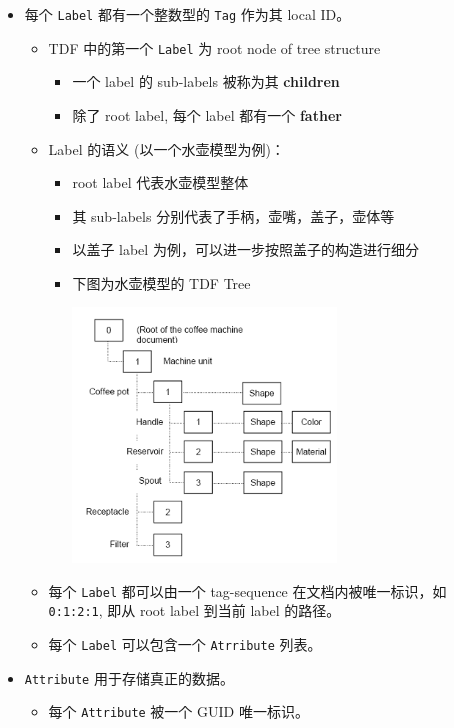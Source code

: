 \documentclass[11pt]{article}
\begin{document}
\begin{itemize}
\item 每个 \texttt{Label} 都有一个整数型的 \texttt{Tag} 作为其 local ID。
\begin{itemize}
\item TDF 中的第一个 \texttt{Label} 为 root node of tree structure
\begin{itemize}
\item 一个 label 的 sub-labels 被称为其 \textbf{children}
\item 除了 root label, 每个 label 都有一个 \textbf{father}
\end{itemize}
\item Label 的语义 (以一个水壶模型为例)：
\begin{itemize}
\item root label 代表水壶模型整体
\item 其 sub-labels 分别代表了手柄，壶嘴，盖子，壶体等
\item 以盖子 label 为例，可以进一步按照盖子的构造进行细分
\item 下图为水壶模型的 TDF Tree
\begin{center}
\includegraphics[width=7cm]{./img/ocaf_tdf_tree_of_kettle.png}
\end{center}
\end{itemize}
\item 每个 \texttt{Label} 都可以由一个 tag-sequence 在文档内被唯一标识，如 \texttt{0:1:2:1}, 即从 root label 到当前 label 的路径。
\item 每个 \texttt{Label} 可以包含一个 \texttt{Atrribute} 列表。
\end{itemize}
\item \texttt{Attribute} 用于存储真正的数据。
\begin{itemize}
\item 每个 \texttt{Attribute} 被一个 GUID 唯一标识。
\end{itemize}
\end{itemize}
\end{document}
